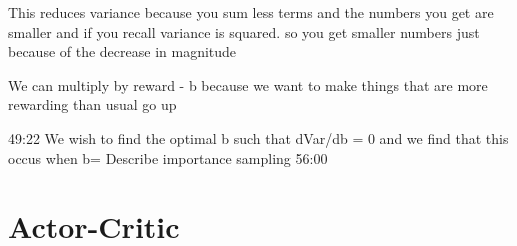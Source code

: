 \documentclass{article}
\begin{document}
This reduces variance because you sum less terms and the numbers you get are smaller and if you recall variance is squared. so you get smaller numbers just because of the decrease in magnitude

We can multiply by reward - b because we want to make things that are more rewarding than usual go up

49:22
We wish to find the optimal b such that dVar/db = 0 and we find that this occus when b=
Describe importance sampling 56:00

\section{Actor-Critic}

\small


\end{document}
